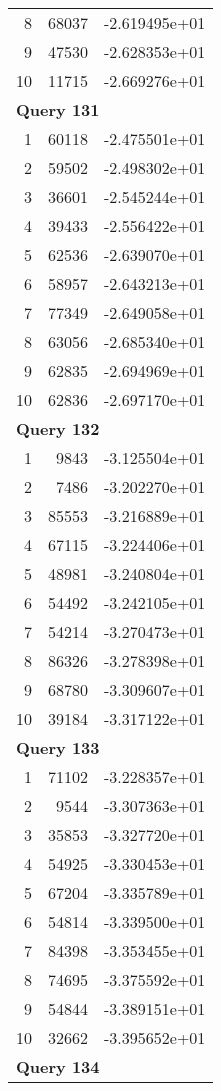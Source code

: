 \begin{longtable}[{p}]{@{}rrp{}@{}}
8 & 68037 & -2.619495e+01 \\
9 & 47530 & -2.628353e+01 \\
10 & 11715 & -2.669276e+01 \\
\midrule
\multicolumn{3}{l}{\bfseries Query 131} \\
1 & 60118 & -2.475501e+01 \\
2 & 59502 & -2.498302e+01 \\
3 & 36601 & -2.545244e+01 \\
4 & 39433 & -2.556422e+01 \\
5 & 62536 & -2.639070e+01 \\
6 & 58957 & -2.643213e+01 \\
7 & 77349 & -2.649058e+01 \\
8 & 63056 & -2.685340e+01 \\
9 & 62835 & -2.694969e+01 \\
10 & 62836 & -2.697170e+01 \\
\midrule
\multicolumn{3}{l}{\bfseries Query 132} \\
1 & 9843 & -3.125504e+01 \\
2 & 7486 & -3.202270e+01 \\
3 & 85553 & -3.216889e+01 \\
4 & 67115 & -3.224406e+01 \\
5 & 48981 & -3.240804e+01 \\
6 & 54492 & -3.242105e+01 \\
7 & 54214 & -3.270473e+01 \\
8 & 86326 & -3.278398e+01 \\
9 & 68780 & -3.309607e+01 \\
10 & 39184 & -3.317122e+01 \\
\midrule
\multicolumn{3}{l}{\bfseries Query 133} \\
1 & 71102 & -3.228357e+01 \\
2 & 9544 & -3.307363e+01 \\
3 & 35853 & -3.327720e+01 \\
4 & 54925 & -3.330453e+01 \\
5 & 67204 & -3.335789e+01 \\
6 & 54814 & -3.339500e+01 \\
7 & 84398 & -3.353455e+01 \\
8 & 74695 & -3.375592e+01 \\
9 & 54844 & -3.389151e+01 \\
10 & 32662 & -3.395652e+01 \\
\midrule
\multicolumn{3}{l}{\bfseries Query 134} \\

\end{longtable}
